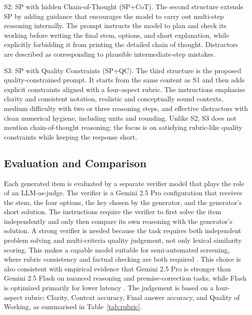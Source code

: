 ﻿\documentclass[a4paper,conference,10pt]{IEEEtran}
\begin{document}
S2: SP with hidden Chain-of-Thought (SP+CoT).  
The second structure extends SP by adding guidance that encourages the model to carry out multi-step reasoning internally. The prompt instructs the model to plan and check its working before writing the final stem, options, and short explanation, while explicitly forbidding it from printing the detailed chain of thought. Distractors are described as corresponding to plausible intermediate-step mistakes.

S3: SP with Quality Constraints (SP+QC).  
The third structure is the proposed quality-constrained prompt. It starts from the same content as S1 and then adds explicit constraints aligned with a four-aspect rubric. The instructions emphasise clarity and consistent notation, realistic and conceptually sound contexts, medium difficulty with two or three reasoning steps, and effective distractors with clean numerical hygiene, including units and rounding. Unlike S2, S3 does not mention chain-of-thought reasoning; the focus is on satisfying rubric-like quality constraints while keeping the response short.

\subsection{Evaluation and Comparison}

Each generated item is evaluated by a separate verifier model that plays the role of an LLM-as-judge. The verifier is a Gemini 2.5 Pro configuration that receives the stem, the four options, the key chosen by the generator, and the generator's short solution. The instructions require the verifier to first solve the item independently and only then compare its own reasoning with the generator's solution. A strong verifier is needed because the task requires both independent problem solving and multi-criteria quality judgement, not only lexical similarity scoring. This makes a capable model suitable for semi-automated screening, where rubric consistency and factual checking are both required \cite{mucciaccia2025}. This choice is also consistent with empirical evidence that Gemini 2.5 Pro is stronger than Gemini 2.5 Flash on nuanced reasoning and premise-correction tasks, while Flash is optimized primarily for lower latency \cite{joshi2025gemini25tradeoff}. The judgement is based on a four-aspect rubric: Clarity, Context accuracy, Final answer accuracy, and Quality of Working, as summarised in Table~\ref{tab:rubric}.
\end{document}
